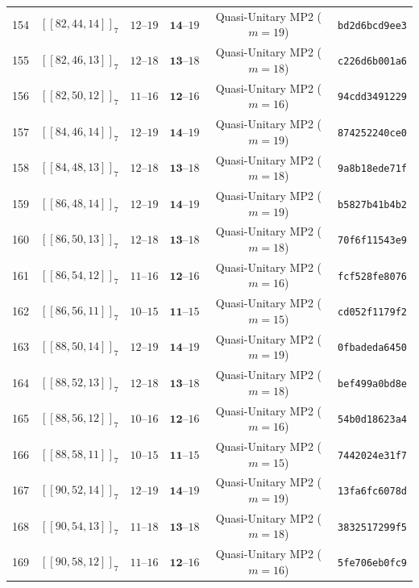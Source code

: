 \documentclass[11pt,a4paper]{article}
\theoremstyle{remark}
\begin{document}
{\begin{longtable}{@{}rccccl@{}}
154 & $[[82,44,14]]_{7}$ & $12\text{--}19$ & $\mathbf{14}\text{--}19$ & Quasi-Unitary MP2 ($m=19$) & \texttt{bd2d6bcd9ee3} \\
155 & $[[82,46,13]]_{7}$ & $12\text{--}18$ & $\mathbf{13}\text{--}18$ & Quasi-Unitary MP2 ($m=18$) & \texttt{c226d6b001a6} \\
156 & $[[82,50,12]]_{7}$ & $11\text{--}16$ & $\mathbf{12}\text{--}16$ & Quasi-Unitary MP2 ($m=16$) & \texttt{94cdd3491229} \\
157 & $[[84,46,14]]_{7}$ & $12\text{--}19$ & $\mathbf{14}\text{--}19$ & Quasi-Unitary MP2 ($m=19$) & \texttt{874252240ce0} \\
158 & $[[84,48,13]]_{7}$ & $12\text{--}18$ & $\mathbf{13}\text{--}18$ & Quasi-Unitary MP2 ($m=18$) & \texttt{9a8b18ede71f} \\
159 & $[[86,48,14]]_{7}$ & $12\text{--}19$ & $\mathbf{14}\text{--}19$ & Quasi-Unitary MP2 ($m=19$) & \texttt{b5827b41b4b2} \\
160 & $[[86,50,13]]_{7}$ & $12\text{--}18$ & $\mathbf{13}\text{--}18$ & Quasi-Unitary MP2 ($m=18$) & \texttt{70f6f11543e9} \\
161 & $[[86,54,12]]_{7}$ & $11\text{--}16$ & $\mathbf{12}\text{--}16$ & Quasi-Unitary MP2 ($m=16$) & \texttt{fcf528fe8076} \\
162 & $[[86,56,11]]_{7}$ & $10\text{--}15$ & $\mathbf{11}\text{--}15$ & Quasi-Unitary MP2 ($m=15$) & \texttt{cd052f1179f2} \\
163 & $[[88,50,14]]_{7}$ & $12\text{--}19$ & $\mathbf{14}\text{--}19$ & Quasi-Unitary MP2 ($m=19$) & \texttt{0fbadeda6450} \\
164 & $[[88,52,13]]_{7}$ & $12\text{--}18$ & $\mathbf{13}\text{--}18$ & Quasi-Unitary MP2 ($m=18$) & \texttt{bef499a0bd8e} \\
165 & $[[88,56,12]]_{7}$ & $10\text{--}16$ & $\mathbf{12}\text{--}16$ & Quasi-Unitary MP2 ($m=16$) & \texttt{54b0d18623a4} \\
166 & $[[88,58,11]]_{7}$ & $10\text{--}15$ & $\mathbf{11}\text{--}15$ & Quasi-Unitary MP2 ($m=15$) & \texttt{7442024e31f7} \\
167 & $[[90,52,14]]_{7}$ & $12\text{--}19$ & $\mathbf{14}\text{--}19$ & Quasi-Unitary MP2 ($m=19$) & \texttt{13fa6fc6078d} \\
168 & $[[90,54,13]]_{7}$ & $11\text{--}18$ & $\mathbf{13}\text{--}18$ & Quasi-Unitary MP2 ($m=18$) & \texttt{3832517299f5} \\
169 & $[[90,58,12]]_{7}$ & $11\text{--}16$ & $\mathbf{12}\text{--}16$ & Quasi-Unitary MP2 ($m=16$) & \texttt{5fe706eb0fc9} \\

\end{longtable}}
\end{document}
